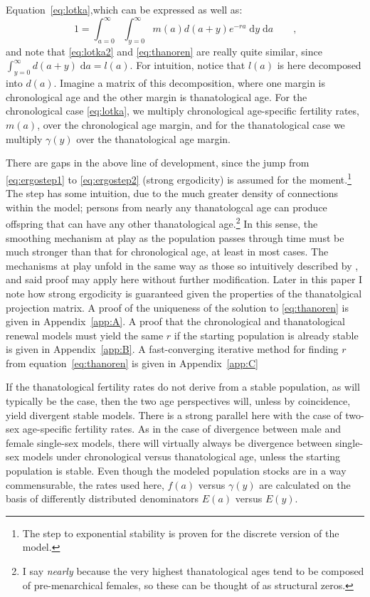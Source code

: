 \documentclass[12pt,oneside,a4paper,leqno]{article}
\newcommand{\dd}{\; \mathrm{d}}
\newcommand{\ec}{\quad\quad\text{,}}
\begin{document}
Equation~\eqref{eq:lotka},which can be expressed as well as:
\begin{equation}
 1 = \int_{a=0}^\infty \int_{y=0}^\infty m(a)d(a+y)e^{-ra}\dd y \dd a \ec
  \label{eq:lotka2}
\end{equation}
and note that \eqref{eq:lotka2} and \eqref{eq:thanoren} are really quite
similar, since $\int _{y=0}^\infty d(a+y)\dd a = l(a)$. For intuition, notice
that $l(a)$ is here decomposed into $d(a)$. Imagine a matrix of this
decomposition, where one margin is chronological age and the other margin is
thanatological age.
For the chronological case \eqref{eq:lotka}, we multiply chronological
age-specific fertility rates, $m(a)$, over the chronological age margin, and for the thanatological case we multiply $\gamma(y)$ over the thanatological age margin.

There are gaps in the above line of development, since the jump from
\eqref{eq:ergostep1} to \eqref{eq:ergostep2} (strong ergodicity) is assumed for
the moment.\footnote{The step to exponential stability is proven
for the discrete version of the model.} The step has some intuition, due to
the much greater density of connections within the model; persons from nearly any
thanatologcal age can produce offspring that can have any other
thanatological age.\footnote{I say \textit{nearly} because the very highest thanatological ages tend to be composed of pre-menarchical females, so these can be thought of as structural
zeros.} In
this sense, the smoothing mechanism at play as the population passes through
time must be much stronger than that for chronological age, at least in most
cases. The mechanisms at play unfold in the same way
as those so intuitively described by \citet{arthur1982ergodic}, and said proof may apply here without
further modification. Later in this paper I note how strong ergodicity is
guaranteed given the properties of the thanatolgical projection matrix. A proof
of the uniqueness of the solution to \eqref{eq:thanoren} is given in
Appendix~\ref{app:A}. A proof that the chronological and thanatological renewal
models must yield the same $r$ if the starting population is already stable is
given in Appendix~\ref{app:B}. A fast-converging iterative method for finding
$r$ from equation~\eqref{eq:thanoren} is given in Appendix~\ref{app:C}

If the thanatological fertility rates do not derive from a stable
population, as will typically be the case, then the two age perspectives
will, unless by coincidence, yield divergent stable models. There is a strong
parallel here with the case of two-sex age-specific fertility rates. As in the
case of divergence between male and female single-sex models, there will
virtually always be divergence between single-sex models under chronological
versus thanatological age, unless the starting population is stable. Even though the modeled population stocks are in a way commensurable, the rates used here, $f(a)$ versus $\gamma(y)$ are calculated on the basis of differently distributed denominators $E(a)$ versus $E(y)$.
\end{document}

